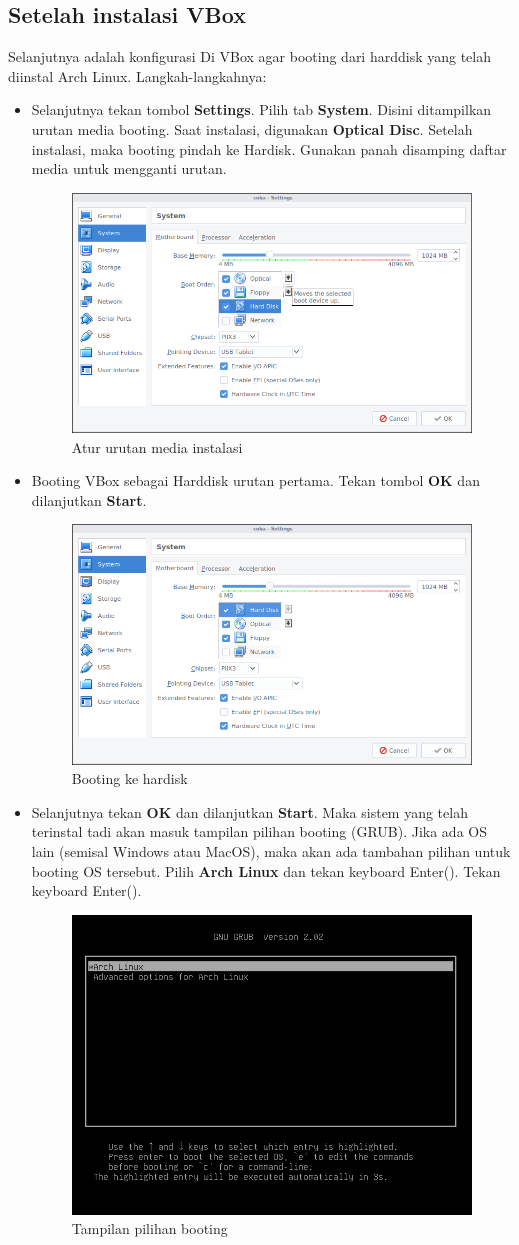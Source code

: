 \documentclass[12pt,]{article}
\begin{document}
	\subsection{Setelah instalasi VBox}
	Selanjutnya adalah konfigurasi Di VBox agar booting dari harddisk yang telah diinstal Arch Linux.
	Langkah-langkahnya:
	\begin{itemize}
		\item Selanjutnya tekan tombol \textbf{Settings}. Pilih tab \textbf{System}.
		Disini ditampilkan urutan media booting.
		Saat instalasi, digunakan \textbf{Optical Disc}.
		Setelah instalasi, maka booting pindah ke Hardisk.
		Gunakan panah disamping daftar media untuk mengganti urutan. 
		\begin{figure}[H]
			\centering
			\includegraphics[width=0.4\linewidth]{images/vbox_afterinstall/s1}
			\caption{Atur urutan media instalasi}
		\end{figure}
	
		\item Booting VBox sebagai Harddisk urutan pertama.
		Tekan tombol \textbf{OK} dan dilanjutkan \textbf{Start}.
			\begin{figure}[H]
			\centering
			\includegraphics[width=0.4\linewidth]{images/vbox_afterinstall/s2}
			\caption{Booting ke hardisk}
		\end{figure}
	
		\item Selanjutnya tekan \textbf{OK} dan dilanjutkan \textbf{Start}.
		Maka sistem yang telah terinstal tadi akan masuk tampilan pilihan booting (GRUB).
		Jika ada OS lain (semisal Windows atau MacOS), maka akan ada tambahan pilihan untuk booting OS tersebut.
		Pilih \textbf{Arch Linux} dan tekan keyboard Enter(\keys{\return}).
		Tekan keyboard Enter(\keys{\return}).
		\begin{figure}[H]
			\centering
			\includegraphics[width=0.4\linewidth]{images/vbox_afterinstall/s3}
			\caption{Tampilan pilihan booting}
		\end{figure}
	

\end{itemize}
\end{document}
